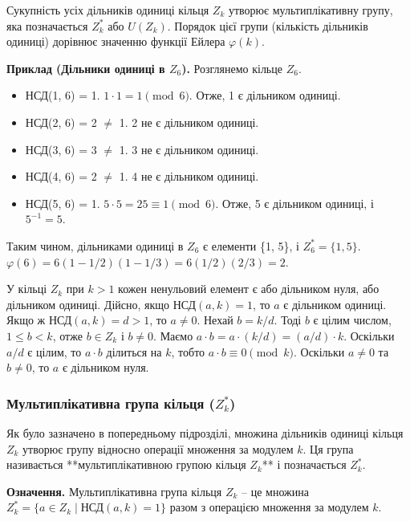 \documentclass[a4paper,12pt]{article}
\begin{document}
    Сукупність усіх дільників одиниці кільця \(Z_k\) утворює мультиплікативну групу, яка позначається \(Z_k^*\) або \(U(Z_k)\). Порядок цієї групи (кількість дільників одиниці) дорівнює значенню функції Ейлера \(\varphi(k)\).

    \textbf{Приклад (Дільники одиниці в \(Z_6\)).} Розглянемо кільце \(Z_6\).
    \begin{itemize}
        \item НСД(1, 6) = 1. \(1 \cdot 1 = 1 \pmod 6\). Отже, 1 є дільником одиниці.
        \item НСД(2, 6) = 2 \(\ne\) 1. 2 не є дільником одиниці.
        \item НСД(3, 6) = 3 \(\ne\) 1. 3 не є дільником одиниці.
        \item НСД(4, 6) = 2 \(\ne\) 1. 4 не є дільником одиниці.
        \item НСД(5, 6) = 1. \(5 \cdot 5 = 25 \equiv 1 \pmod 6\). Отже, 5 є дільником одиниці, і \(5^{-1}=5\).
    \end{itemize}
    Таким чином, дільниками одиниці в \(Z_6\) є елементи \{1, 5\}, і \(Z_6^* = \{1, 5\}\). \(\varphi(6) = 6(1-1/2)(1-1/3) = 6(1/2)(2/3) = 2\).

    У кільці \(Z_k\) при \(k > 1\) кожен ненульовий елемент є або дільником нуля, або дільником одиниці. Дійсно, якщо НСД\((a, k)=1\), то \(a\) є дільником одиниці. Якщо ж НСД\((a, k)=d > 1\), то \(a \ne 0\). Нехай \(b = k/d\). Тоді \(b\) є цілим числом, \(1 \le b < k\), отже \(b \in Z_k\) і \(b \ne 0\). Маємо \(a \cdot b = a \cdot (k/d) = (a/d) \cdot k\). Оскільки \(a/d\) є цілим, то \(a \cdot b\) ділиться на \(k\), тобто \(a \cdot b \equiv 0 \pmod k\). Оскільки \(a \ne 0\) та \(b \ne 0\), то \(a\) є дільником нуля.

    \subsubsection{Мультиплікативна група кільця (\(Z_k^*\))} %
    Як було зазначено в попередньому підрозділі, множина дільників одиниці кільця \(Z_k\) утворює групу відносно операції множення за модулем \(k\). Ця група називається **мультиплікативною групою кільця \(Z_k\)** і позначається \(Z_k^*\).

    \textbf{Означення.} Мультиплікативна група кільця \(Z_k\) -- це множина \(Z_k^* = \{a \in Z_k \mid \text{НСД}(a, k) = 1\}\) разом з операцією множення за модулем \(k\).
\end{document}
